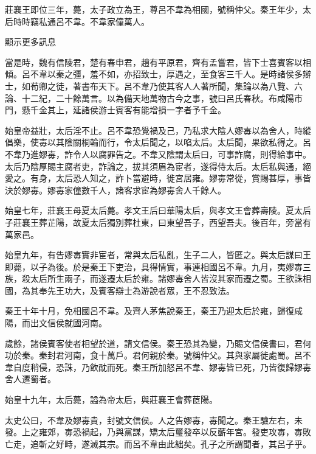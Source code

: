 莊襄王即位三年，薨，太子政立為王，尊呂不韋為相國，號稱仲父。秦王年少，太后時時竊私通呂不韋。不韋家僮萬人。

顯示更多訊息

當是時，魏有信陵君，楚有春申君，趙有平原君，齊有孟嘗君，皆下士喜賓客以相傾。呂不韋以秦之彊，羞不如，亦招致士，厚遇之，至食客三千人。是時諸侯多辯士，如荀卿之徒，著書布天下。呂不韋乃使其客人人著所聞，集論以為八覽、六論、十二紀，二十餘萬言。以為備天地萬物古今之事，號曰呂氏春秋。布咸陽市門，懸千金其上，延諸侯游士賓客有能增損一字者予千金。

始皇帝益壯，太后淫不止。呂不韋恐覺禍及己，乃私求大陰人嫪毐以為舍人，時縱倡樂，使毐以其陰關桐輪而行，令太后聞之，以啗太后。太后聞，果欲私得之。呂不韋乃進嫪毐，詐令人以腐罪告之。不韋又陰謂太后曰，可事詐腐，則得給事中。太后乃陰厚賜主腐者吏，詐論之，拔其須眉為宦者，遂得侍太后。太后私與通，絕愛之。有身，太后恐人知之，詐卜當避時，徙宮居雍。嫪毐常從，賞賜甚厚，事皆決於嫪毐。嫪毐家僮數千人，諸客求宦為嫪毐舍人千餘人。

始皇七年，莊襄王母夏太后薨。孝文王后曰華陽太后，與孝文王會葬壽陵。夏太后子莊襄王葬芷陽，故夏太后獨別葬杜東，曰東望吾子，西望吾夫。後百年，旁當有萬家邑。

始皇九年，有告嫪毐實非宦者，常與太后私亂，生子二人，皆匿之。與太后謀曰王即薨，以子為後。於是秦王下吏治，具得情實，事連相國呂不韋。九月，夷嫪毐三族，殺太后所生兩子，而遂遷太后於雍。諸嫪毐舍人皆沒其家而遷之蜀。王欲誅相國，為其奉先王功大，及賓客辯士為游說者眾，王不忍致法。

秦王十年十月，免相國呂不韋。及齊人茅焦說秦王，秦王乃迎太后於雍，歸復咸陽，而出文信侯就國河南。

歲餘，諸侯賓客使者相望於道，請文信侯。秦王恐其為變，乃賜文信侯書曰，君何功於秦。秦封君河南，食十萬戶。君何親於秦。號稱仲父。其與家屬徙處蜀。呂不韋自度稍侵，恐誅，乃飲酖而死。秦王所加怒呂不韋、嫪毐皆已死，乃皆復歸嫪毐舍人遷蜀者。

始皇十九年，太后薨，謚為帝太后，與莊襄王會葬茝陽。

太史公曰，不韋及嫪毐貴，封號文信侯。人之告嫪毐，毐聞之。秦王驗左右，未發。上之雍郊，毐恐禍起，乃與黨謀，矯太后璽發卒以反蘄年宮。發吏攻毐，毐敗亡走，追斬之好畤，遂滅其宗。而呂不韋由此絀矣。孔子之所謂聞者，其呂子乎。